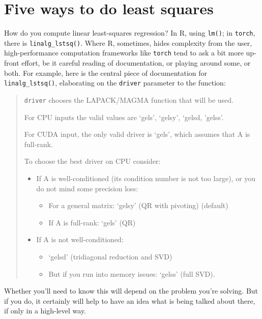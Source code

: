 \documentclass[
  letterpaper,
]{krantz}
\providecommand{\tightlist}{%
  \setlength{\itemsep}{0pt}\setlength{\parskip}{0pt}}\usepackage{longtable,booktabs,array}
\begin{document}
\hypertarget{five-ways-to-do-least-squares}{%
\section{Five ways to do least
squares}\label{five-ways-to-do-least-squares}}

How do you compute linear least-squares regression? In R, using
\texttt{lm()}; in \texttt{torch}, there is
\texttt{linalg\_lstsq()}.
Where R, sometimes, hides complexity from the user, high-performance
computation frameworks like \texttt{torch} tend to ask a bit more
up-front effort, be it careful reading of documentation, or playing
around some, or both. For example, here is the central piece of
documentation for \texttt{linalg\_lstsq()}, elaborating on the
\texttt{driver} parameter to the function:

\begin{quote}
\texttt{driver} chooses the LAPACK/MAGMA function that will be used.

For CPU inputs the valid values are `gels', `gelsy', `gelsd, 'gelss'.

For CUDA input, the only valid driver is `gels', which assumes that A is
full-rank.

To choose the best driver on CPU consider:

\begin{itemize}
\tightlist
\item
  If A is well-conditioned (its condition number is not too large), or
  you do not mind some precision loss:

  \begin{itemize}
  \item
    For a general matrix: `gelsy' (QR with pivoting) (default)
  \item
    If A is full-rank: `gels' (QR)
  \end{itemize}
\item
  If A is not well-conditioned:

  \begin{itemize}
  \item
    `gelsd' (tridiagonal reduction and SVD)
  \item
    But if you run into memory issues: `gelss' (full SVD).
  \end{itemize}
\end{itemize}
\end{quote}

Whether you'll need to know this will depend on the problem you're
solving. But if you do, it certainly will help to have an idea what is
being talked about there, if only in a high-level way.
\end{document}
